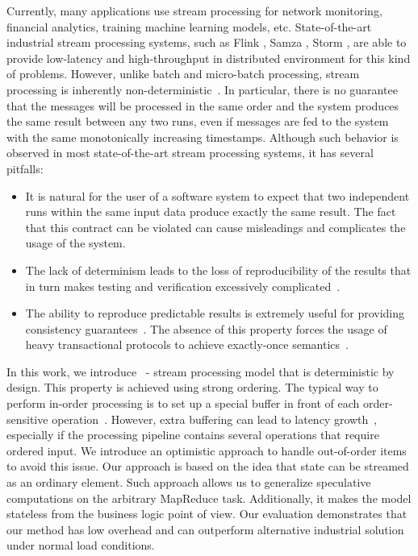 
\label {fs-intro-seciton}

Currently, many  
applications use stream processing for network monitoring, financial analytics, training machine learning models, etc. 
State-of-the-art industrial stream processing systems, such as Flink \cite{carbone2015apache}, Samza \cite{Noghabi:2017:SSS:3137765.3137770}, Storm \cite{apache:storm}, are able to provide low-latency and high-throughput in distributed environment for this kind of problems. 
However, unlike batch and micro-batch processing, stream processing is inherently non-deterministic~\cite{Zaharia:2012:DSE:2342763.2342773}. 
In particular, there is no guarantee that the messages will be processed in the same order and the system produces the same result between any two runs, even if messages are fed to the system with the same monotonically increasing timestamps. 
Although such behavior is observed in most state-of-the-art stream processing systems, it has several 
pitfalls:

\begin{itemize}
 \item 
It is natural for the user of a software system to expect  that two independent runs within the same input data produce exactly the same result. The fact that this contract can be violated can cause misleadings and complicates the usage of the system.

    \item 
    The lack of determinism leads to the loss of reproducibility of the results that in turn makes
    testing and verification excessively complicated~\cite{Zacheilas:2017:MDS:3093742.3093921}.
    \item 
    The ability to reproduce predictable results is extremely useful for providing consistency guarantees~\cite{Stonebraker:2005:RRS:1107499.1107504}. 
    The absence of this property forces the usage of heavy transactional protocols to achieve exactly-once semantics~\cite{Carbone:2017:SMA:3137765.3137777, jacques2016consistent}.
\end{itemize}

In this work, we introduce \FlameStream\ - stream processing model that is deterministic by design. This property is achieved using strong ordering. 
The typical way to perform in-order processing is to set up a special buffer in front of each order-sensitive operation~\cite{Li:2008:OPN:1453856.1453890}. 
However, extra buffering can lead to latency growth~\cite{Zacheilas:2017:MDS:3093742.3093921}, especially if the processing pipeline contains several operations that require ordered input. We introduce an optimistic approach to handle out-of-order items to avoid this issue. 
Our approach is based on the idea that state can be streamed as an ordinary element. 
Such approach allows us to generalize speculative computations on the arbitrary MapReduce task. 
Additionally, it makes the model stateless from the business logic point of view. Our evaluation demonstrates that our method has low overhead and can outperform alternative industrial solution under normal load conditions.

